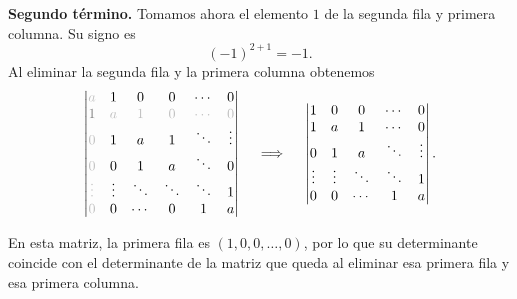 \documentclass[a4paper,12pt]{article}
\begin{document}
\begin{ejercicio}[title=Ejercicio 40]
\textbf{Segundo término.}  
Tomamos ahora el elemento $1$ de la segunda fila y primera columna. Su signo es
\[
(-1)^{2+1}=-1.
\]
Al eliminar la segunda fila y la primera columna obtenemos
\[
\begin{vmatrix}
\color{lightgray}{a} & 1 & 0 & 0 & \cdots & 0\\
\color{gray}{1} & \color{lightgray}{a} & \color{lightgray}{1} & \color{lightgray}{0} & \color{lightgray}\cdots & \color{lightgray}{0}\\
\color{lightgray}{0} & 1 & a & 1 & \ddots & \vdots\\
\color{lightgray}{0} & 0 & 1 & a & \ddots & 0\\
\color{lightgray}\vdots & \vdots & \ddots & \ddots & \ddots & 1\\
\color{lightgray}{0} & 0 & \cdots & 0 & 1 & a
\end{vmatrix}
\quad\implies\quad
\begin{vmatrix}
1 & 0 & 0 & \cdots & 0\\
1 & a & 1 & \cdots & 0\\
0 & 1 & a & \ddots & \vdots\\
\vdots & \vdots & \ddots & \ddots & 1\\
0 & 0 & \cdots & 1 & a
\end{vmatrix}.
\]

En esta matriz, la primera fila es $(1,0,0,\dots,0)$, por lo que su determinante coincide con el determinante de la matriz que queda al eliminar esa primera fila y esa primera columna.
\end{ejercicio}
\end{document}
